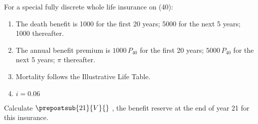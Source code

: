 For a special fully discrete whole life insurance on (40):
\begin{enumerate}
\item The death benefit is 1000 for the first 20 years; 5000 for the next 5 years; 1000 thereafter.
\item The annual benefit premium is $1000\,P_{40}$ for the first 20 years; $5000\,P_{40}$ for the next 5 years; $\pi$ thereafter.
\item Mortality follows the Illustrative Life Table.
\item $i = 0.06$
\end{enumerate}
Calculate $\prepostsub{21}{V}{}$ , the benefit reserve at the end of year 21 for this insurance.
